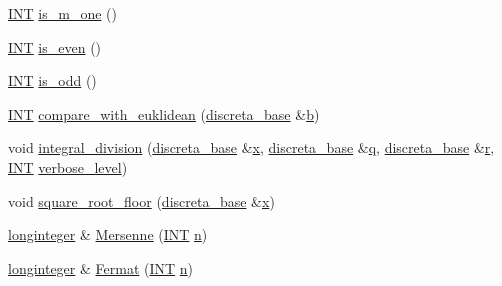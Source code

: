 \begin{DoxyCompactItemize}
\item 
\mbox{\hyperlink{galois_8h_a09fddde158a3a20bd2dcadb609de11dc}{I\+NT}} \mbox{\hyperlink{classlonginteger_aa47d6521fc1dc8058d9eaa516caefabe}{is\+\_\+m\+\_\+one}} ()
\item 
\mbox{\hyperlink{galois_8h_a09fddde158a3a20bd2dcadb609de11dc}{I\+NT}} \mbox{\hyperlink{classlonginteger_a12ad4725b43f023ed9861d3f48ba69fe}{is\+\_\+even}} ()
\item 
\mbox{\hyperlink{galois_8h_a09fddde158a3a20bd2dcadb609de11dc}{I\+NT}} \mbox{\hyperlink{classlonginteger_a5110768d8c2cfc82037d6d3ae4ead236}{is\+\_\+odd}} ()
\item 
\mbox{\hyperlink{galois_8h_a09fddde158a3a20bd2dcadb609de11dc}{I\+NT}} \mbox{\hyperlink{classlonginteger_a71b27b9c767c0da8964151323810f315}{compare\+\_\+with\+\_\+euklidean}} (\mbox{\hyperlink{classdiscreta__base}{discreta\+\_\+base}} \&\mbox{\hyperlink{alphabet2_8_c_a148e3876077787926724625411d6e7a9}{b}})
\item 
void \mbox{\hyperlink{classlonginteger_a692f761cfc91770ca40ab5c2df4bd358}{integral\+\_\+division}} (\mbox{\hyperlink{classdiscreta__base}{discreta\+\_\+base}} \&\mbox{\hyperlink{alphabet2_8_c_a6150e0515f7202e2fb518f7206ed97dc}{x}}, \mbox{\hyperlink{classdiscreta__base}{discreta\+\_\+base}} \&\mbox{\hyperlink{simeon_8_c_a92cbb483a3b27ae1a0dbfcb125ce216f}{q}}, \mbox{\hyperlink{classdiscreta__base}{discreta\+\_\+base}} \&\mbox{\hyperlink{alphabet2_8_c_acab531abaa74a7e664e3986f2522b33a}{r}}, \mbox{\hyperlink{galois_8h_a09fddde158a3a20bd2dcadb609de11dc}{I\+NT}} \mbox{\hyperlink{simeon_8_c_a818073fbcc2f439e7c56952f67386122}{verbose\+\_\+level}})
\item 
void \mbox{\hyperlink{classlonginteger_a1b5b30f8bc750d1304390f518e43aa0f}{square\+\_\+root\+\_\+floor}} (\mbox{\hyperlink{classdiscreta__base}{discreta\+\_\+base}} \&\mbox{\hyperlink{alphabet2_8_c_a6150e0515f7202e2fb518f7206ed97dc}{x}})
\item 
\mbox{\hyperlink{classlonginteger}{longinteger}} \& \mbox{\hyperlink{classlonginteger_a549866ae981b0229715752adc96be386}{Mersenne}} (\mbox{\hyperlink{galois_8h_a09fddde158a3a20bd2dcadb609de11dc}{I\+NT}} \mbox{\hyperlink{simeon_8_c_a7f2cd26777ce0ff3fdaf8d02aacbddfb}{n}})
\item 
\mbox{\hyperlink{classlonginteger}{longinteger}} \& \mbox{\hyperlink{classlonginteger_ae120eb593e762937a8f45ca3643ed49c}{Fermat}} (\mbox{\hyperlink{galois_8h_a09fddde158a3a20bd2dcadb609de11dc}{I\+NT}} \mbox{\hyperlink{simeon_8_c_a7f2cd26777ce0ff3fdaf8d02aacbddfb}{n}})
\item 

\end{DoxyCompactItemize}
